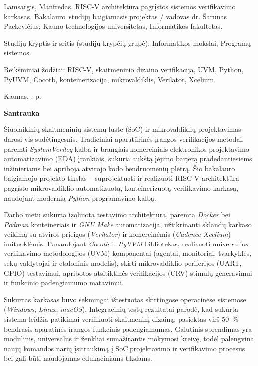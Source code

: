 \thispagestyle{empty}
Lamsargis, Manfredas. RISC-V architektūra pagrįstos sistemos verifikavimo karkasas. Bakalauro studijų baigiamasis projektas / vadovas dr. Šarūnas Packevičius; Kauno technologijos universitetas, Informatikos fakultetas.

Studijų kryptis ir sritis (studijų krypčių grupė): Informatikos mokslai, Programų sistemos.

Reikšminiai žodžiai: RISC-V, skaitmeninio dizaino verifikacija, UVM, Python, PyUVM, Cocotb, konteinerizacija, mikrovaldiklis, Verilator, Xcelium.

Kaunas, \the\year. \pageref{LastPage} p.

\begin{center}
	\textbf{Santrauka}
\end{center}

Šiuolaikinių skaitmeninių sistemų luste (SoC) ir mikrovaldiklių projektavimas darosi vis sudėtingesnis. Tradiciniai aparatūrinės įrangos verifikacijos metodai, paremti \textit{SystemVerilog} kalba ir brangiais komerciniais elektronikos projektavimo automatizavimo (EDA) įrankiais, sukuria aukštą įėjimo barjerą pradedantiesiems inžinieriams bei apriboja atvirojo kodo bendruomenių plėtrą. Šio bakalauro baigiamojo projekto tikslas -- suprojektuoti ir realizuoti RISC-V architektūra pagrįsto mikrovaldiklio automatizuotą, konteinerizuotą verifikavimo karkasą, naudojant modernią \textit{Python} programavimo kalbą.

Darbo metu sukurta izoliuota testavimo architektūra, paremta \textit{Docker} bei \textit{Podman} konteineriais ir \textit{GNU Make} automatizacija, užtikrinanti sklandų karkaso veikimą su atviros prieigos (\textit{Verilator}) ir komercinėmis (\textit{Cadence Xcelium}) imituoklėmis. Panaudojant \textit{Cocotb} ir \textit{PyUVM} bibliotekas, realizuoti universalios verifikavimo metodologijos (UVM) komponentai (agentai, monitoriai, tvarkyklės, sekų valdytojai ir etaloninis modelis), skirti mikrovaldiklio periferijos (UART, GPIO) testavimui, apribotos atsitiktinės verifikacijos (CRV) stimulų generavimui ir funkcinio padengiamumo matavimui.

Sukurtas karkasas buvo sėkmingai ištestuotas skirtingose operacinėse sistemose (\textit{Windows}, \textit{Linux}, \textit{macOS}). Integracinių testų rezultatai parodė, kad sukurta sistema leidžia patikimai verifikuoti skaitmeninį dizainą: pasiektas virš 50~\% bendrasis aparatinės įrangos funkcinis padengiamumas. Galutinis sprendimas yra modulinis, universalus ir ženkliai sumažinantis mokymosi kreivę, todėl palengvina naujų komandos narių įsitraukimą į SoC projektavimo ir verifikavimo procesus bei gali būti naudojamas edukaciniams tikslams.


